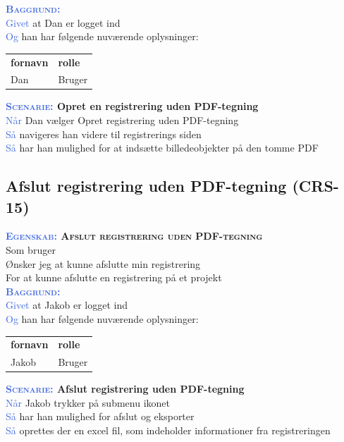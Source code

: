 \textsc{\textcolor{RoyalBlue}{\textbf{Baggrund:}}}\\
\textcolor{RoyalBlue}{Givet} at Dan er logget ind\\
\textcolor{RoyalBlue}{Og} han har følgende nuværende oplysninger:\\
\begin{tabular}{| l | l |}
	\textbf{fornavn} & \textbf{rolle} \\
	Dan & Bruger\\
\end{tabular}
\newline

\textbf{\textsc{\textcolor{RoyalBlue}{Scenarie:}} Opret en registrering uden PDF-tegning}\\
\textcolor{RoyalBlue}{Når} Dan vælger Opret registrering uden PDF-tegning\\
\textcolor{RoyalBlue}{Så} navigeres han videre til registrerings siden\\
\textcolor{RoyalBlue}{Så} har han mulighed for at indsætte billedeobjekter på den tomme PDF\\

\clearpage

\subsection{Afslut registrering uden PDF-tegning (CRS-15)} \label{sec:USAfslutRegUdenPDF}
\textbf{\textsc{\textcolor{RoyalBlue}{Egenskab:} Afslut registrering uden PDF-tegning}}\\
Som bruger\\
Ønsker jeg at kunne afslutte min registrering\\
For at kunne afslutte en registrering på et projekt\\

\textsc{\textcolor{RoyalBlue}{\textbf{Baggrund:}}}\\
\textcolor{RoyalBlue}{Givet} at Jakob er logget ind\\
\textcolor{RoyalBlue}{Og} han har følgende nuværende oplysninger:\\
\begin{tabular}{| l | l |}
	\textbf{fornavn} & \textbf{rolle} \\
	Jakob & Bruger\\
\end{tabular}

\textbf{\textsc{\textcolor{RoyalBlue}{Scenarie:}} Afslut registrering uden PDF-tegning}\\
\textcolor{RoyalBlue}{Når} Jakob trykker på submenu ikonet\\
\textcolor{RoyalBlue}{Så}  har han mulighed for afslut og eksporter\\
\textcolor{RoyalBlue}{Så}  oprettes der en excel fil, som indeholder informationer fra registreringen\\


